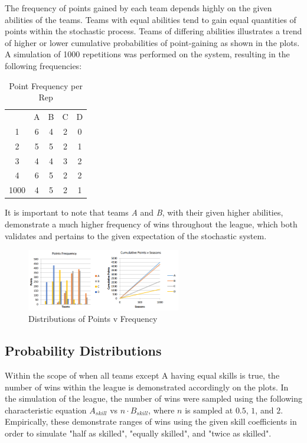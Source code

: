 \documentclass[12pt]{article}
\begin{document}
The frequency of points gained by each team depends highly on the given abilities of the teams. Teams with equal abilities tend to gain equal quantities of points within the stochastic process. Teams of differing abilities illustrates a trend of higher or lower cumulative probabilities of point-gaining as shown in the plots. A simulation of 1000 repetitions was performed on the system, resulting in the following frequencies:

\begin{table}[h]
\centering
\begin{tabular}{ccccc}
     & A & B & C & D \\
1    & 6 & 4 & 2 & 0 \\
2    & 5 & 5 & 2 & 1 \\
3    & 4 & 4 & 3 & 2 \\
4    & 6 & 5 & 2 & 2 \\
1000 & 4 & 5 & 2 & 1
\end{tabular}
\caption{Point Frequency per Rep}
\end{table}

It is important to note that teams \emph{A} and \emph{B}, with their given higher abilities, demonstrate a much higher frequency of wins throughout the league, which both validates and pertains to the given expectation of the stochastic system.

\begin{figure}[h]
\centering
\includegraphics[width=0.6\textwidth]{q1ii_graphs.png}
\caption{Distributions of Points v Frequency}
\end{figure}

\subsection{Probability Distributions}
Within the scope of when all teams except A having equal skills is true, the number of wins within the league is demonstrated accordingly on the plots. In the simulation of the league, the number of wins were sampled using the following characteristic equation $A_{skill}$ vs $n \cdot B_{skill}$, where $n$ is sampled at $0.5$, $1$, and $2$. Empirically, these demonstrate ranges of wins using the given skill coefficients in order to simulate "half as skilled", "equally skilled", and "twice as skilled".
\end{document}
